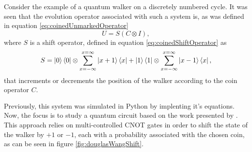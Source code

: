 \documentclass[../../dissertation.tex]{subfiles}
\begin{document}
Consider the example of a quantum walker on a discretely numbered cycle. It was seen that the evolution operator associated with such a system is, as was defined in equation \ref{eq:coinedUnmarkedOperator}
\begin{equation}
	   U = S(C\otimes I), 
           \label{eq:coinedUnmarkedOperatorQiskit}
\end{equation}
where $S$ is a shift operator, defined in equation \ref{eq:coinedShiftOperator} as 
\begin{equation}
          S = \ket{0}\bra{0} \otimes \sum_{x=-\infty}^{x=\infty} \ket{x+1}\bra{x} + \ket{1}\bra{1}\otimes \sum_{x=-\infty}^{x=\infty} \ket{x-1}\bra{x},
\end{equation} 
that increments or decrements the position of the walker according to the coin operator $C$.\par
Previously, this system was simulated in Python by implenting it's equations. Now, the focus is to study a quantum circuit based on the work presented by \cite{douglaswang07}. This approach relies on multi-controlled CNOT gates in order to shift the state of the walker by $+1$ or $-1$, each with a probability associated with the chosen coin, as can be seen in figure \ref{fig:douglasWangShift}. 
\end{document}
